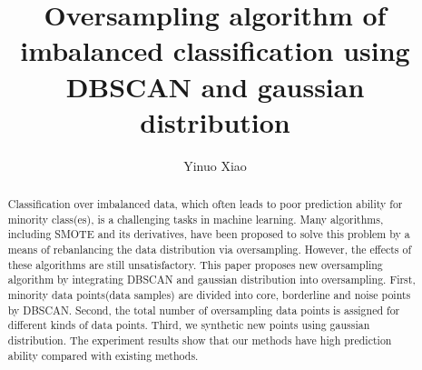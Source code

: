 \documentclass[runningheads]{llncs}
\begin{document}
%
\title{Oversampling algorithm of imbalanced classification using DBSCAN and gaussian distribution}
%
%
\author{Yinuo Xiao}
%
%
%
\maketitle              %
%
\begin{abstract}

Classification over imbalanced data, which often leads to poor prediction ability for 
minority class(es), is a challenging tasks in machine learning.
Many algorithms, including SMOTE and its derivatives, 
have been proposed to
solve this problem by a means of rebanlancing the data distribution via oversampling. However, 
the effects of these algorithms are still unsatisfactory. This paper proposes
new oversampling algorithm by integrating DBSCAN and gaussian distribution into oversampling.  
First, minority data points(data samples) are
divided into core, borderline and noise points by DBSCAN. 
Second, the total number of oversampling data points is
assigned for different kinds of data points. Third, 
we synthetic new points using gaussian distribution.
The experiment results
show that our methods have high prediction ability compared with existing methods.


\end{abstract}
%
%
%
\end{document}
